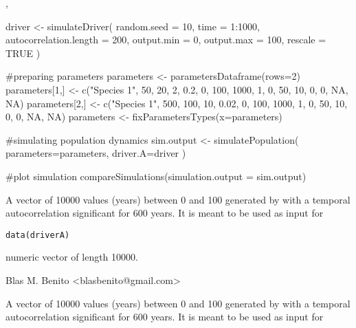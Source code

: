 \documentclass[letterpaper]{book}
\begin{document}
%
\begin{SeeAlso}\relax
{}, 
\end{SeeAlso}
%
\begin{Examples}
\begin{ExampleCode}

driver <- simulateDriver(
 random.seed = 10,
 time = 1:1000,
 autocorrelation.length = 200,
 output.min = 0,
 output.max = 100,
 rescale = TRUE
 )

#preparing parameters
parameters <- parametersDataframe(rows=2)
parameters[1,] <- c("Species 1", 50, 20, 2, 0.2, 0, 100, 1000, 1, 0, 50, 10, 0, 0, NA, NA)
parameters[2,] <- c("Species 1", 500, 100, 10, 0.02, 0, 100, 1000, 1, 0, 50, 10, 0, 0, NA, NA)
parameters <- fixParametersTypes(x=parameters)

#simulating population dynamics
sim.output <- simulatePopulation(
 parameters=parameters,
 driver.A=driver
 )

#plot simulation
compareSimulations(simulation.output = sim.output)

\end{ExampleCode}
\end{Examples}
%
\begin{Description}\relax
A vector of 10000 values (years) between 0 and 100 generated by  with a temporal autocorrelation significant for 600 years. It is meant to be used as input for 
\end{Description}
%
\begin{Usage}
\begin{verbatim}
data(driverA)
\end{verbatim}
\end{Usage}
%
\begin{Format}
numeric vector of length 10000.
\end{Format}
%
\begin{Author}\relax
Blas M. Benito  <blasbenito@gmail.com>
\end{Author}
%
\begin{SeeAlso}\relax
{}
\end{SeeAlso}
%
\begin{Description}\relax
A vector of 10000 values (years) between 0 and 100 generated by  with a temporal autocorrelation significant for 600 years. It is meant to be used as input for 
\end{Description}
\end{document}
